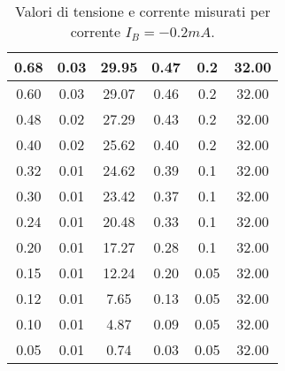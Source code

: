 \documentclass[a4paper, 11pt]{article}
\begin{document}
\begin{table}[!htb]
\begin{tabular}{|c|c|c|c|c|c|}
        \hline 
        0.68 & 0.03 & 29.95 & 0.47 & 0.2 & 32.00 \\
        \hline 
        0.60 & 0.03 & 29.07 & 0.46 & 0.2 & 32.00 \\
        \hline 
        0.48 & 0.02 & 27.29 & 0.43 & 0.2 & 32.00 \\
        \hline
        0.40 & 0.02 & 25.62 & 0.40 & 0.2 & 32.00 \\
        \hline 
        0.32 & 0.01 & 24.62 & 0.39 & 0.1 & 32.00 \\
        \hline 
        0.30 & 0.01 & 23.42 & 0.37 & 0.1 & 32.00 \\
        \hline 
        0.24 & 0.01 & 20.48 & 0.33 & 0.1 & 32.00 \\
        \hline 
        0.20 & 0.01 & 17.27 & 0.28 & 0.1 & 32.00 \\
        \hline 
        0.15 & 0.01 & 12.24 & 0.20 & 0.05 & 32.00 \\
        \hline 
        0.12 & 0.01 & 7.65 & 0.13 &	0.05 & 32.00 \\
        \hline 
        0.10 & 0.01 & 4.87 & 0.09 &	0.05 & 32.00 \\
        \hline 
        0.05 & 0.01 & 0.74 & 0.03 &	0.05 & 32.00 \\
        \hline 
    \end{tabular} 
    \caption{Valori di tensione e corrente misurati per corrente $I_B = -0.2 mA$.}
    \label{tab:-0.2 mA}
\end{table}
\end{document}
